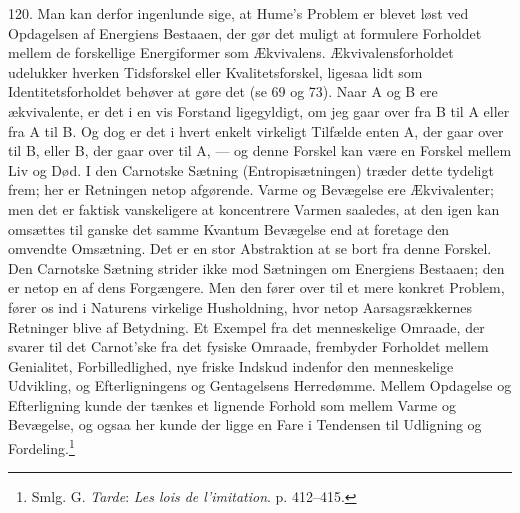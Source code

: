 \documentclass[12pt,a4paper]{book}
\newcommand{\apage}[1]{\marginnote{\footnotesize\textit{[#1]}}}
\begin{document}
120. Man kan derfor ingenlunde sige, at Hume's Problem er blevet løst ved
Opdagelsen af Energiens Bestaaen, der gør det muligt at formulere Forholdet mellem
de forskellige Energiformer som Ækvivalens. Ækvivalensforholdet udelukker hverken
Tidsforskel eller Kvalitetsforskel, ligesaa lidt som Identitetsforholdet behøver at
gøre det (se 69 og 73). Naar A og B ere ækvivalente, er det i en vis Forstand
ligegyldigt, om jeg gaar over fra B til A eller fra A \apage{286} til B. Og dog er det i hvert
enkelt virkeligt Tilfælde enten A, der gaar over til B, eller B, der gaar over til
A, --- og denne Forskel kan være en Forskel mellem Liv og Død. I den Carnotske
Sætning (Entropisætningen) træder dette tydeligt frem; her er Retningen netop
afgørende. Varme og Bevægelse ere Ækvivalenter; men det er faktisk vanskeligere at
koncentrere Varmen saaledes, at den igen kan omsættes til ganske det samme Kvantum
Bevægelse end at foretage den omvendte Omsætning. Det er en stor Abstraktion at se
bort fra denne Forskel. Den Carnotske Sætning strider ikke mod Sætningen om
Energiens Bestaaen; den er netop en af dens Forgængere. Men den fører over til et
mere konkret Problem, fører os ind i Naturens virkelige Husholdning, hvor netop
Aarsagsrækkernes Retninger blive af Betydning. Et Exempel fra det menneskelige
Omraade, der svarer til det Carnot'ske fra det fysiske Omraade, frembyder Forholdet
mellem Genialitet, Forbilledlighed, nye friske Indskud indenfor den menneskelige
Udvikling, og Efterligningens og Gentagelsens Herredømme. Mellem Opdagelse og
Efterligning kunde der tænkes et lignende Forhold som mellem Varme og Bevægelse, og
ogsaa her kunde der ligge en Fare i Tendensen til Udligning og
Fordeling.\footnote{Smlg. G. \emph{Tarde}: \emph{Les lois de l'imitation}. p.
412--415.}
\end{document}
